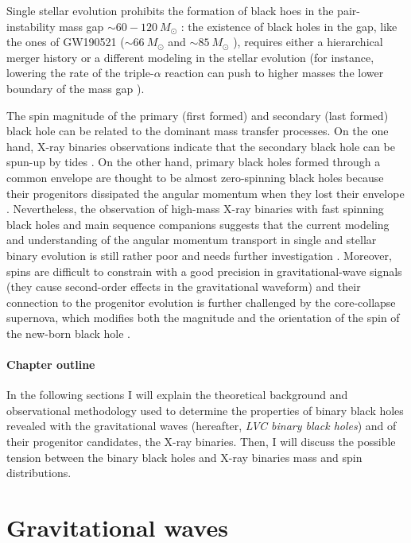 \documentclass[a4paper,titlepage]{book}     	%
\newcommand{\sun}{\ensuremath{_\odot}}
\newcommand{\msun}{\ensuremath{M\sun}}
\begin{document}
Single stellar evolution prohibits the formation of black hoes in the pair-instability mass gap $\sim 60 - 120 ~\msun$ \cite{spera2017_pisnSNe}: the existence of black holes in the gap, like the ones of GW190521 ($\sim 66~\msun$ and $\sim 85~\msun$ \cite{GW190521_abbott2020}), requires either a hierarchical merger history or a different modeling in the stellar evolution (for instance, lowering the rate of the triple-$\alpha$ reaction can push to higher masses the lower boundary of the mass gap \cite{MassGapStellarEvo_Costa2021}).

The spin magnitude of the primary (first formed) and secondary (last formed) black hole can be related to the dominant mass transfer processes. On the one hand, X-ray binaries observations indicate that the secondary black hole can be spun-up by tides \cite{spinupBH_Bavera2020}. On the other hand, primary black holes formed through a common envelope are thought to be almost zero-spinning black holes because their progenitors dissipated the angular momentum when they lost their envelope \cite{spinBH_Qin2018}.  Nevertheless, the observation of high-mass X-ray binaries with fast spinning black holes and main sequence companions suggests that the current modeling and understanding of the angular momentum transport in single and stellar binary evolution is still rather poor and needs further investigation \cite{spinfastBH_Qin2019}. Moreover, spins are difficult to constrain with a good precision in gravitational-wave signals (they cause second-order effects in the gravitational waveform) and their connection to the progenitor evolution is further challenged by the core-collapse supernova, which modifies both the magnitude and the orientation of the spin of the new-born black hole \cite{GWTC-3_interpretation}.

\paragraph{Chapter outline}
In the following sections I will explain the theoretical background and observational methodology used to determine the properties of binary black holes  revealed with the gravitational waves (hereafter, \emph{LVC binary black holes}) and of their progenitor candidates, the X-ray binaries. Then, I will discuss the possible tension between the binary black holes and X-ray binaries mass and spin distributions. 


\section{Gravitational waves}\label{sec:GW}
\end{document}
